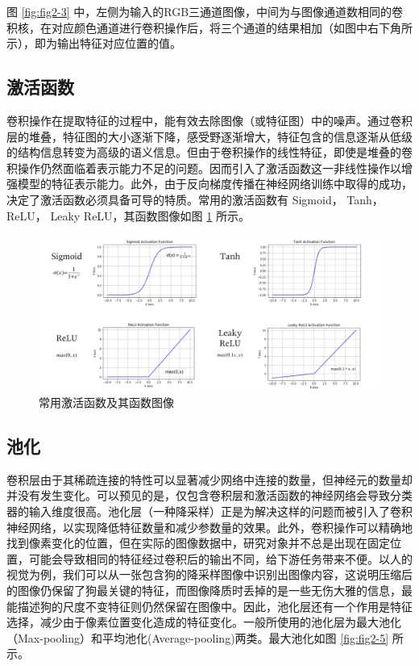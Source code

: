 图 \ref{fig:fig2-3} 中，左侧为输入的RGB三通道图像，中间为与图像通道数相同的卷积核，在对应颜色通道进行卷积操作后，将三个通道的结果相加（如图中右下角所示），即为输出特征对应位置的值。

\subsection{激活函数}

卷积操作在提取特征的过程中，能有效去除图像（或特征图）中的噪声。通过卷积层的堆叠，特征图的大小逐渐下降，感受野逐渐增大，特征包含的信息逐渐从低级的结构信息转变为高级的语义信息。但由于卷积操作的线性特征，即使是堆叠的卷积操作仍然面临着表示能力不足的问题。因而引入了激活函数这一非线性操作以增强模型的特征表示能力。此外，由于反向梯度传播在神经网络训练中取得的成功，决定了激活函数必须具备可导的特质。常用的激活函数有 Sigmoid， Tanh， ReLU， Leaky ReLU，其函数图像如图 \ref{fig:fig2-4} 所示。

\begin{figure}[!htbp]
	\centering
	\includegraphics{figures/5.png}
	\caption{常用激活函数及其函数图像}
	\label{fig:fig2-4}
\end{figure}

\subsection{池化}

卷积层由于其稀疏连接的特性可以显著减少网络中连接的数量，但神经元的数量却并没有发生变化。可以预见的是，仅包含卷积层和激活函数的神经网络会导致分类器的输入维度很高。池化层（一种降采样）正是为解决这样的问题而被引入了卷积神经网络，以实现降低特征数量和减少参数量的效果。此外，卷积操作可以精确地找到像素变化的位置，但在实际的图像数据中，研究对象并不总是出现在固定位置，可能会导致相同的特征经过卷积后的输出不同，给下游任务带来不便。以人的视觉为例，我们可以从一张包含狗的降采样图像中识别出图像内容，这说明压缩后的图像仍保留了狗最关键的特征，而图像降质时丢掉的是一些无伤大雅的信息，最能描述狗的尺度不变特征则仍然保留在图像中。因此，池化层还有一个作用是特征选择，减少由于像素位置变化造成的特征变化。一般所使用的池化层为最大池化（Max-pooling）和平均池化(Average-pooling)两类。最大池化如图 \ref{fig:fig2-5} 所示。

